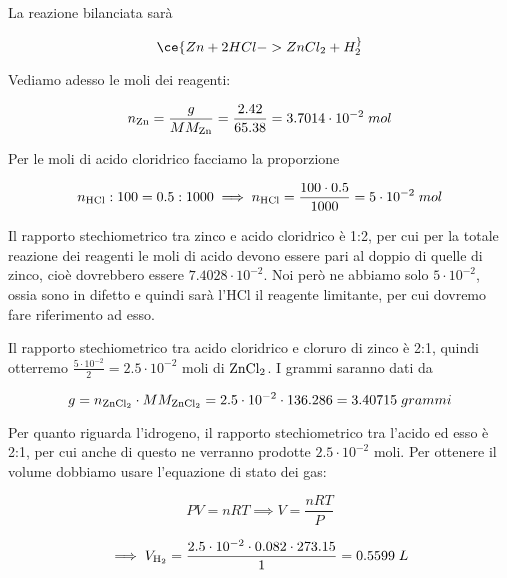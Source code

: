 La reazione bilanciata sarà

$$\ce{Zn + 2HCl -> ZnCl_2 + H_2 ^}$$

Vediamo adesso le moli dei reagenti:

$$n_{\rm Zn}=\frac{g}{MM_{\rm Zn}}=\frac{2.42}{65.38}=3.7014 \cdot 10^{-2}\;mol$$

Per le moli di acido cloridrico facciamo la proporzione

$$n_{\rm HCl}:100=0.5:1000
\implies
n_{\rm HCl}=\frac{100 \cdot 0.5}{1000}=5 \cdot 10^{-2}\;mol$$

Il rapporto stechiometrico tra zinco e acido cloridrico è 1:2, per cui per la totale reazione dei reagenti le moli di acido devono essere pari al doppio di quelle di zinco, cioè dovrebbero essere $7.4028 \cdot 10^{-2}$. Noi però ne abbiamo solo $5 \cdot 10^{-2}$, ossia sono in difetto e quindi sarà l'HCl il reagente limitante, per cui dovremo fare riferimento ad esso.

Il rapporto stechiometrico tra acido cloridrico e cloruro di zinco è 2:1, quindi otterremo $\frac{5\cdot 10^{-2}}{2}=2.5 \cdot 10^{-2}$ moli di $\rm ZnCl_2$. I grammi saranno dati da

$$g=n_{\rm ZnCl_2} \cdot MM_{\rm ZnCl_2}=2.5 \cdot 10^{-2} \cdot 136.286=3.40715\;grammi$$

Per quanto riguarda l'idrogeno, il rapporto stechiometrico tra l'acido ed esso è 2:1, per cui anche di questo ne verranno prodotte $2.5 \cdot 10^{-2}$ moli. Per ottenere il volume dobbiamo usare l'equazione di stato dei gas:

$$PV=nRT \implies V=\frac{nRT}{P}$$

$$\implies V_{\rm H_2}
=\frac{2.5 \cdot 10^{-2} \cdot 0.082 \cdot 273.15}{1}
=0.5599\;L$$
